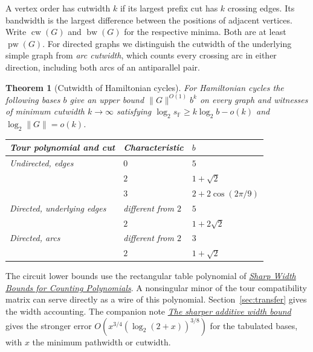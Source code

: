 \documentclass[11pt]{article}
\newtheorem{theorem}{Theorem}[section]
\theoremstyle{definition}
\newcommand{\F}{\mathbb F}
\newcommand{\pw}{\operatorname{pw}}
\begin{document}
A vertex order has cutwidth \(k\) if its largest prefix cut has \(k\) crossing edges. Its bandwidth is the largest difference between the positions of adjacent vertices. Write \(\operatorname{cw}(G)\) and \(\operatorname{bw}(G)\) for the respective minima. Both are at least \(\pw(G)\). For directed graphs we distinguish the cutwidth of the underlying simple graph from \emph{arc cutwidth}, which counts every crossing arc in either direction, including both arcs of an antiparallel pair.

\begin{theorem}[Cutwidth of Hamiltonian cycles]\label{thm:layouts}
For Hamiltonian cycles the following bases \(b\) give an upper bound \(\|G\|^{O(1)}b^k\) on every graph and witnesses of minimum cutwidth \(k\to\infty\) satisfying
\(\log_2 s_\F\ge k\log_2 b-o(k)\) and \(\log_2 \|G\|=o(k)\).
\begin{center}
\normalfont\begin{tabular}{@{}lll@{}}
\hline
Tour polynomial and cut & Characteristic & \(b\)\\
\hline
Undirected, edges & \(0\) & \(5\)\\
                  & \(2\) & \(1+\sqrt2\)\\
                  & \(3\) & \(2+2\cos(2\pi/9)\)\\
Directed, underlying edges & different from \(2\) & \(5\)\\
                           & \(2\) & \(1+2\sqrt2\)\\
Directed, arcs & different from \(2\) & \(3\)\\
               & \(2\) & \(1+\sqrt2\)\\
\hline
\end{tabular}
\end{center}
\end{theorem}

The circuit lower bounds use the rectangular table polynomial of \href{sharp-pathwidth-bases.pdf}{\emph{Sharp Width Bounds for Counting Polynomials}}. A nonsingular minor of the tour compatibility matrix can serve directly as a wire of this polynomial. Section~\ref{sec:transfer} gives the width accounting. The companion note \href{sharper-additive-bound.md}{\emph{The sharper additive width bound}} gives the stronger error \(O(x^{3/4}(\log_2(2+x))^{3/8})\) for the tabulated bases, with \(x\) the minimum pathwidth or cutwidth.
\end{document}
